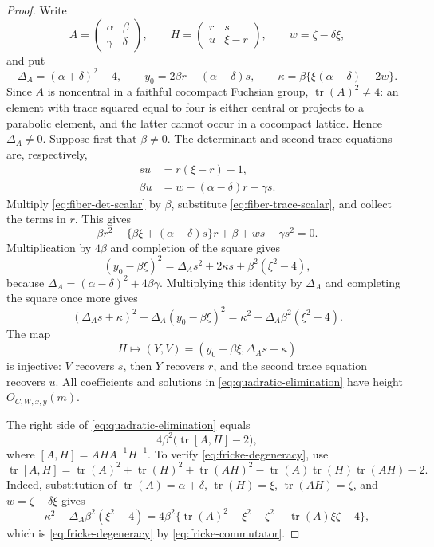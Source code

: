 \documentclass[11pt,reqno]{amsart}
\theoremstyle{definition}
\theoremstyle{remark}
\newcommand{\Tr}{\operatorname{tr}}
\begin{document}
\begin{proof}
Write
\[
 A=\begin{pmatrix}\alpha&\beta\\ \gamma&\delta\end{pmatrix},
 \qquad
 H=\begin{pmatrix}r&s\\ u&\xi-r\end{pmatrix},
 \qquad w=\zeta-\delta\xi,
\]
and put
\[
 \Delta_A=(\alpha+\delta)^2-4,\qquad
 y_0=2\beta r-(\alpha-\delta)s,
 \qquad \kappa=\beta\{\xi(\alpha-\delta)-2w\}.
\]
Since \(A\) is noncentral in a faithful cocompact Fuchsian group,
\(\Tr(A)^2\ne4\): an element with trace squared equal to four is either
central or projects to a parabolic element, and the latter cannot occur in
a cocompact lattice.  Hence \(\Delta_A\ne0\).  Suppose first that
\(\beta\ne0\).  The determinant and
second trace equations are, respectively,
\begin{align}
 su&=r(\xi-r)-1,
 \label{eq:fiber-det-scalar}\\
 \beta u&=w-(\alpha-\delta)r-\gamma s.
 \label{eq:fiber-trace-scalar}
\end{align}
Multiply \eqref{eq:fiber-det-scalar} by \(\beta\), substitute
\eqref{eq:fiber-trace-scalar}, and collect the terms in \(r\).  This gives
\[
 \beta r^2-\{\beta\xi+(\alpha-\delta)s\}r
      +\beta+ws-\gamma s^2=0.
\]
Multiplication by \(4\beta\) and completion of the square gives
\[
 (y_0-\beta\xi)^2
 =\Delta_As^2+2\kappa s+\beta^2(\xi^2-4),
\]
because
\(\Delta_A=(\alpha-\delta)^2+4\beta\gamma\).  Multiplying this identity by
\(\Delta_A\) and completing the square once more gives
\begin{equation}\label{eq:quadratic-elimination}
 (\Delta_As+\kappa)^2-\Delta_A(y_0-\beta\xi)^2
 =\kappa^2-\Delta_A\beta^2(\xi^2-4).
\end{equation}
The map
\[
 H\longmapsto
 (Y,V)=(y_0-\beta\xi,\Delta_As+\kappa)
\]
is injective: \(V\) recovers \(s\), then \(Y\) recovers \(r\), and the
second trace equation recovers \(u\).  All coefficients and solutions in
\eqref{eq:quadratic-elimination} have height \(O_{C,W,x,y}(m)\).

The right side of \eqref{eq:quadratic-elimination} equals
\begin{equation}\label{eq:fricke-degeneracy}
 4\beta^2\bigl(\Tr[A,H]-2\bigr),
\end{equation}
where \([A,H]=AHA^{-1}H^{-1}\).  To verify
\eqref{eq:fricke-degeneracy}, use
\begin{equation}\label{eq:fricke-commutator}
 \Tr[A,H]
 =\Tr(A)^2+\Tr(H)^2+\Tr(AH)^2
  -\Tr(A)\Tr(H)\Tr(AH)-2.
\end{equation}
Indeed, substitution of \(\Tr(A)=\alpha+\delta\),
\(\Tr(H)=\xi\), \(\Tr(AH)=\zeta\), and
\(w=\zeta-\delta\xi\) gives
\[
 \kappa^2-\Delta_A\beta^2(\xi^2-4)
 =4\beta^2\{\Tr(A)^2+\xi^2+\zeta^2
       -\Tr(A)\xi\zeta-4\},
\]
which is \eqref{eq:fricke-degeneracy} by
\eqref{eq:fricke-commutator}.


\end{proof}
\end{document}
